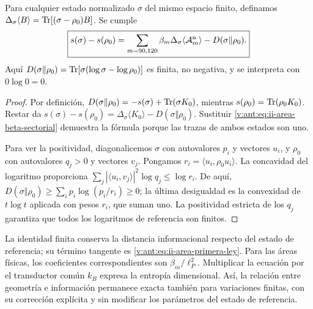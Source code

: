 \begin{theorem}
\label{v:ant:thm:ii-area-ley-finita}
Para cualquier estado normalizado \(\sigma\) del mismo espacio finito,
definamos \(\Delta_\sigma\langle B\rangle
=\operatorname{Tr}[(\sigma-\rho_0)B]\). Se cumple
\begin{equation}
 \boxed{
 s(\sigma)-s(\rho_0)
 =\sum_{m=90,120}\beta_m
      \Delta_\sigma\langle\mathcal A_m^{\rm n}\rangle
   -D(\sigma\Vert\rho_0).}
 \label{v:ant:eq:ii-area-ley-finita}
\end{equation}
Aquí \(D(\sigma\Vert\rho_0)=\operatorname{Tr}[\sigma(\log\sigma-\log\rho_0)]\)
es finita, no negativa, y se interpreta con \(0\log0=0\).
\end{theorem}
\begin{proof}
Por definición,
\(D(\sigma\Vert\rho_0)=-s(\sigma)+\operatorname{Tr}(\sigma K_0)\), mientras
\(s(\rho_0)=\operatorname{Tr}(\rho_0K_0)\). Restar da
\(s(\sigma)-s(\rho_0)=\Delta_\sigma\langle K_0\rangle
-D(\sigma\Vert\rho_0)\). Sustituir
\eqref{v:ant:eq:ii-area-beta-sectorial} demuestra la fórmula porque las
trazas de ambos estados son uno.

Para ver la positividad, diagonalicemos \(\sigma\) con autovalores
\(p_i\) y vectores \(u_i\), y \(\rho_0\) con autovalores
\(q_j>0\) y vectores \(v_j\). Pongamos
\(r_i=\langle u_i,\rho_0u_i\rangle\). La concavidad del logaritmo
proporciona
\(\sum_j|\langle u_i,v_j\rangle|^2\log q_j\le\log r_i\).
De aquí,
\(D(\sigma\Vert\rho_0)\ge\sum_i p_i\log(p_i/r_i)\ge0\);
la última desigualdad es la convexidad de \(t\log t\) aplicada
con pesos \(r_i\), que suman uno. La positividad estricta de los
\(q_j\) garantiza que todos los logaritmos de referencia son finitos.
\end{proof}

La identidad finita conserva la distancia informacional respecto del
estado de referencia; su término tangente es
\eqref{v:ant:eq:ii-area-primera-ley}. Para las áreas físicas, los
coeficientes correspondientes son \(\beta_m/\ell_P^2\).
Multiplicar la ecuación por el transductor común \(k_B\) expresa
la entropía dimensional. Así, la relación entre geometría e información
permanece exacta también para variaciones finitas, con su corrección
explícita y sin modificar los parámetros del estado de referencia.

